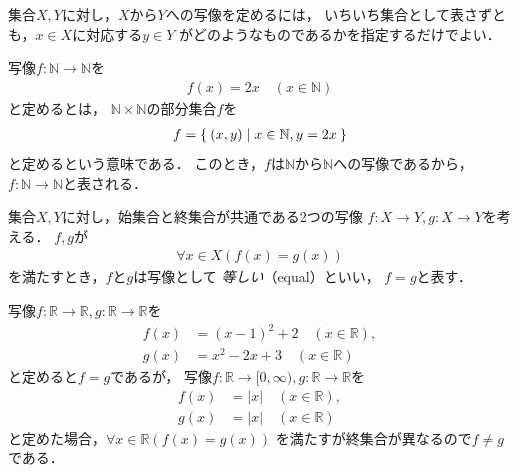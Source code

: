     集合$X,  Y$に対し，$X$から$Y$への写像を定めるには，
    いちいち集合として表さずとも，$x \in X$に対応する$y \in Y$
    がどのようなものであるかを指定するだけでよい．

    \begin{ex} \label{ex:mappingeq}
      写像$f : \mathbb{N} \longrightarrow \mathbb{N}$を
      \begin{align*}
        f (x) = 2x \quad ( x \in \mathbb{N} )
      \end{align*}
      と定めるとは，
      $\mathbb{N} \times \mathbb{N}$の部分集合$f$を
      \begin{align*}
        f = \Set{ (x,y) \mid x \in \mathbb{N} ,  y = 2x}
      \end{align*}
      と定めるという意味である．
      このとき，$f$は$\mathbb{N}$から$\mathbb{N}$への写像であるから，
      $f: \mathbb{N} \longrightarrow \mathbb{N}$と表される．
    \end{ex}
    
    集合$X,  Y$に対し，始集合と終集合が共通である2つの写像
    $f: X \longrightarrow Y,  g: X \longrightarrow Y$を考える．
    $f,  g$が
    \begin{align}
      \forall x \in X (f(x) =g(x))
    \end{align}
    を満たすとき，$f$と$g$は写像として \emph{等しい}（equal）といい，
    $f=g$と表す．

    \begin{ex}
      写像$f: \mathbb{R} \longrightarrow \mathbb{R},  
      g: \mathbb{R} \longrightarrow \mathbb{R}$を
      \begin{align*}
        f(x) & = (x-1)^2 +2  \quad ( x \in \mathbb{R} ), \\
        g(x) & = x^2 -2x +3  \quad ( x \in \mathbb{R} ) 
      \end{align*}
      と定めると$f=g$であるが，
      写像$f: \mathbb{R} \longrightarrow [0, \infty),  
      g: \mathbb{R} \longrightarrow \mathbb{R}$を
      \begin{align*}
        f(x) & = \lvert x \rvert \quad ( x \in \mathbb{R}), \\
        g(x) & = \lvert x \rvert \quad ( x \in \mathbb{R} ) 
      \end{align*}
      と定めた場合，$\forall x \in \mathbb{R} (f(x) = g(x))$
      を満たすが終集合が異なるので$f \neq g$である．
    \end{ex}
   
